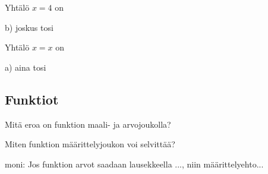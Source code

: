 \begin{tehtava}
Yhtälö $x = 4$ on
\begin{alakohdat}
\end{alakohdat}
\begin{vastaus}
b) joskus tosi
\end{vastaus}
\end{tehtava}

\begin{tehtava}
Yhtälö $x = x$ on
\begin{alakohdat}
\end{alakohdat}
\begin{vastaus}
a) aina tosi
\end{vastaus}
\end{tehtava}


\subsection*{Funktiot}

\begin{tehtava}
Mitä eroa on funktion maali- ja arvojoukolla?
\begin{vastaus}

\end{vastaus}
\end{tehtava}

Miten funktion määrittelyjoukon voi selvittää?

moni: Jos funktion arvot saadaan lausekkeella ..., niin määrittelyehto...

\newpage